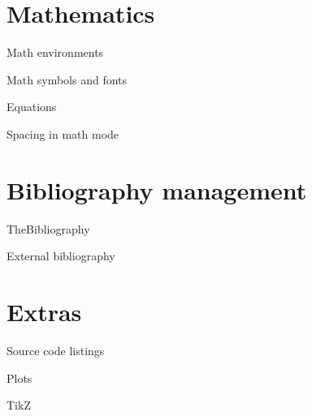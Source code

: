 \documentclass[xetex, onlymath]{beamer}
\begin{document}
\section{Mathematics}
\begin{frame}{Math environments}
\end{frame}

\begin{frame}{Math symbols and fonts}
\end{frame}

\begin{frame}{Equations}
\end{frame}

\begin{frame}{Spacing in math mode}
\end{frame}

\section{Bibliography management}
\begin{frame}{TheBibliography}
\end{frame}

\begin{frame}{External bibliography}
\end{frame}

\section{Extras}
\begin{frame}{Source code listings}
\end{frame}

\begin{frame}{Plots}
\end{frame}

\begin{frame}{TikZ}
\end{frame}
\end{document}
